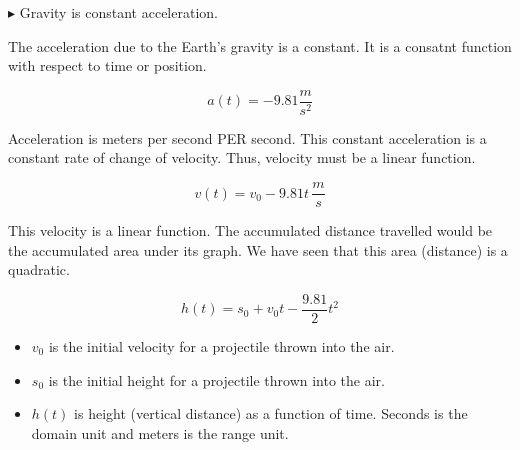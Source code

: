 \documentclass{ximera}
\begin{document}
$\blacktriangleright$ Gravity is constant acceleration.

The acceleration due to the Earth's gravity is a constant.  It is a consatnt function with respect to time or position.


\[ a(t) = -9.81 \frac{m}{s^2}  \]



Acceleration is meters per second PER second.  This constant acceleration is a constant rate of change of velocity.  Thus, velocity must be a linear function.




\[ v(t) = v_0 - 9.81 t  \, \frac{m}{s}\]



This velocity is a linear function. The accumulated distance travelled would be the accumulated area under its graph. We have seen that this area (distance) is a quadratic. 




\[ h(t) = s_0 + v_0 t - \frac{9.81}{2} t^2  \]




\begin{itemize}
\item $v_0$ is the initial velocity for a projectile thrown into the air. \\

\item $s_0$ is the initial height for a projectile thrown into the air. \\

\item $h(t)$ is height (vertical distance) as a function of time.  Seconds is the domain unit and meters is the range unit.
\end{itemize}
\end{document}
